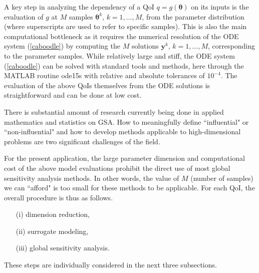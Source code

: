 A key  step in analyzing the dependency of a QoI $q = g(\boldsymbol{\theta})$ on its inputs is the evaluation of $g$ at $M$ samples $\boldsymbol\theta^k$, $k=1,\dots, M$, from the parameter distribution (where superscripts are used to refer to specific samples). 
This is also the  main  computational bottleneck as it requires the numerical resolution of  the ODE system (\ref{caboodle})  by computing the $M$ solutions $\mathbf y^k$, $k=1,\dots , M$, corresponding to  the parameter samples. 
While relatively large and stiff, the ODE system (\ref{caboodle}) can be  solved with standard tools and methods, here through the MATLAB routine ode15s  with relative and absolute tolerances of $10^{-4}$. The evaluation of the above QoIs themselves from the ODE solutions is straightforward and can be done at low cost.

There is substantial amount of research currently being done in applied mathematics and statistics on GSA. How to meaningfully define ``influential" or ``non-influential" and  how to develop methods applicable to high-dimensional problems are two significant challenges of the field. 



For the present application, the large parameter dimension and computational cost of the above model evaluations prohibit the direct use of most global sensitivity analysis methods. In other words, the value of $M$ (number of samples)  we can ``afford" is too small for these methods to be applicable. 
For each QoI, the overall procedure is thus as follows. 

\begin{enumerate}
\item[(i)] dimension reduction,
\item[(ii)] surrogate modeling,
\item[(iii)] global sensitivity analysis.
\end{enumerate}

These steps are individually considered in the next three subsections. 




